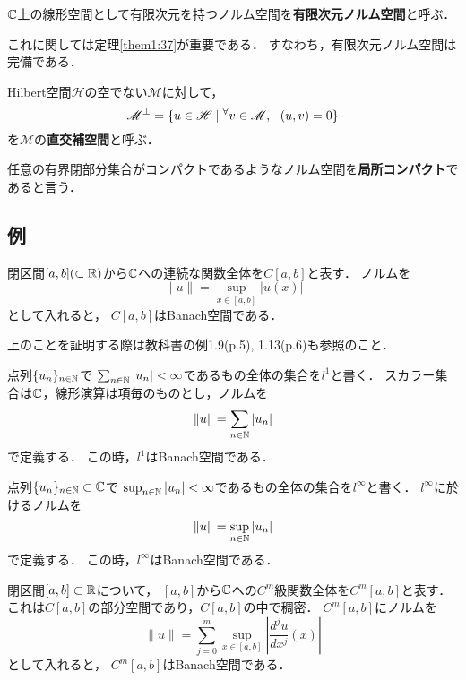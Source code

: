 \documentclass[a4j]{jsarticle}
\begin{document}
        \begin{Def}
            $\mathbb{C}$上の線形空間として有限次元を持つノルム空間を\textbf{有限次元ノルム空間}と呼ぶ．
        \end{Def}
        これに関しては定理\ref{them1:37}が重要である．
        すなわち，有限次元ノルム空間は完備である．

        \begin{Def}
            Hilbert空間$\mathscr{H}$の空でない$\mathscr{M}$に対して，
            \[ \mathscr{M}^{\perp}=\{ u \in \mathscr{H} \mid {}^{\forall} v \in \mathscr{M},~~ (u,v)=0\} \]
            を$\mathscr{M}$の\textbf{直交補空間}と呼ぶ．
        \end{Def}

        \begin{Def}
            任意の有界閉部分集合がコンパクトであるようなノルム空間を\textbf{局所コンパクト}であると言う．
        \end{Def}

    \subsection{例}
        \begin{Example}[例1.17, p.8]
            閉区間$[a,b]( \subset \mathbb{R})$から$\mathbb{C}$への連続な関数全体を$C[a,b]$と表す．
            ノルムを\[ \|u\|=\displaystyle{\sup_{x \in [a,b]}{|u(x)|}} \]として入れると，
            $C[a,b]$はBanach空間である．
        \end{Example}
        上のことを証明する際は教科書の例1.9(p.5), 1.13(p.6)も参照のこと．

        \begin{Example}[例1.18, p.9]
            点列$\{u_n\}_{n \in \mathbb{N}}$で
            $\sum_{n \in \mathbb{N}}{|u_n|}<\infty$であるもの全体の集合を$l^1$と書く．
            スカラー集合は$\mathbb{C}$，線形演算は項毎のものとし，ノルムを\[ \|u\|=\sum_{n \in \mathbb{N}}{|u_n|} \]で定義する．
            この時，$l^1$はBanach空間である．
        \end{Example}
        \begin{Example}[例1.19, p.10]
            点列$\{u_n\}_{n \in \mathbb{N}} \subset \mathbb{C}$で
            $\sup_{n \in \mathbb{N}}{|u_n|}<\infty$であるもの全体の集合を$l^{\infty}$と書く．
            $l^{\infty}$に於けるノルムを\[ \|u\|=\sup_{n \in \mathbb{N}}{|u_n|} \]で定義する．
            この時，$l^{\infty}$はBanach空間である．
        \end{Example}
        \begin{Example}[例1.33, p.19]
            閉区間$[a,b] \subset \mathbb{R}$について，
            $[a,b]$から$\mathbb{C}$への$C^m$級関数全体を$C^m[a,b]$と表す．
            これは$C[a,b]$の部分空間であり，$C[a,b]$の中で稠密．
            $C^m[a,b]$にノルムを
            \[ \|u\|=\sum_{j=0}^{m}{ \sup_{x \in [a,b]}{\left| \frac{d^j u}{dx^j}(x) \right|} } \]
            として入れると，
            $C^m[a,b]$はBanach空間である．
        \end{Example}
\end{document}

